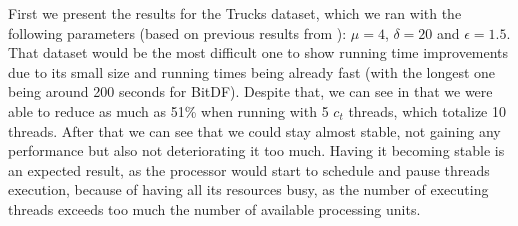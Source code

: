 {First we present the results for the Trucks dataset, which we ran with the following parameters (based on previous
results from ): $\mu=4$, $\delta=20$ and $\epsilon=1.5$. That dataset would be the most difficult one
to show running time improvements due to its small size and running times being already fast (with the longest one being
around 200 seconds for BitDF). Despite that, we can see in  that we were able to reduce as
much as 51\% when running with 5 $c_t$ threads, which totalize 10 threads. After that we can see that we could stay
almost stable, not gaining any performance but also not deteriorating it too much. Having it becoming stable is an
expected result, as the processor would start to schedule and pause threads execution, because of having all its
resources busy, as the number of executing threads exceeds too much the number of available processing units.

}
